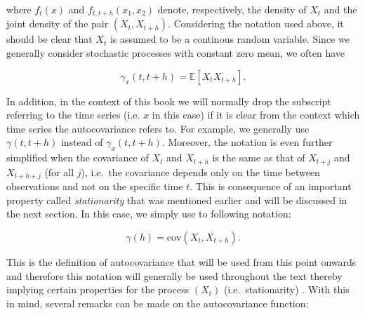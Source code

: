 \documentclass[]{book}
\theoremstyle{definition}
\theoremstyle{definition}
\theoremstyle{definition}
\theoremstyle{remark}
\begin{document}
where \({f_t}\left( x \right)\) and
\(f_{t,t+h}\left( {{x_1},{x_2}} \right)\) denote, respectively, the
density of \(X_t\) and the joint density of the pair \((X_t, X_{t+h})\).
Considering the notation used above, it should be clear that \(X_t\) is
assumed to be a continous random variable. Since we generally consider
stochastic processes with constant zero mean, we often have

\[{\gamma_x}\left( {t,t+h} \right) = \mathbb{E}\left[X_t X_{t+h} \right]. \]

In addition, in the context of this book we will normally drop the
subscript referring to the time series (i.e. \(x\) in this case) if it
is clear from the context which time series the autocovariance refers
to. For example, we generally use \({\gamma}\left( {t,t+h} \right)\)
instead of \({\gamma_x}\left( {t,t+h} \right)\). Moreover, the notation
is even further simplified when the covariance of \(X_t\) and
\(X_{t+h}\) is the same as that of \(X_{t+j}\) and \(X_{t+h+j}\) (for
all \(j\)), i.e.~the covariance depends only on the time between
observations and not on the specific time \(t\). This is consequence of
an important property called \emph{stationarity} that was mentioned
earlier and will be discussed in the next section. In this case, we
simply use to following notation:

\[\gamma \left( {h} \right) = \text{cov} \left( X_t , X_{t+h} \right). \]

This is the definition of autocovariance that will be used from this
point onwards and therefore this notation will generally be used
throughout the text thereby implying certain properties for the process
\((X_t)\) (i.e.~stationarity) . With this in mind, several remarks can
be made on the autocovariance function:
\end{document}
